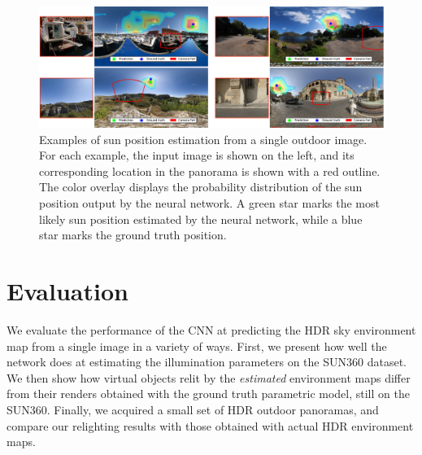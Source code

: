 \newcommand{\EvalHeight}{3.5cm}
\newcommand{\RndrHght}{3.2cm}
\newcommand{\RndrWdth}{4.1cm}
\newcommand{\CropWidth}{3.4cm}
\newcommand{\CropHght}{2.5cm}
\newcommand{\PanoWidth}{5.0cm}

\begin{figure}
    \centering
    \includegraphics[width=\linewidth]{figures/sunpos_estim/sunpos.pdf}
    \caption{Examples of sun position estimation from a single outdoor image. For each example, the input image is shown on the left, and its corresponding location in the panorama is shown with a red outline. The color overlay displays the probability distribution of the sun position output by the neural network. A green star marks the most likely sun position estimated by the neural network, while a blue star marks the ground truth position. }
    \label{fig:evaluation_example_sun_position}
\end{figure}

\section{Evaluation}
\label{sec:evaluation}

We evaluate the performance of the CNN at predicting the HDR sky environment map from a single image in a variety of ways. First, we present how well the network does at estimating the illumination parameters on the SUN360 dataset. We then show how virtual objects relit by the \emph{estimated} environment maps differ from their renders obtained with the ground truth parametric model, still on the SUN360. Finally, we acquired a small set of HDR outdoor panoramas, and compare our relighting results with those obtained with actual HDR environment maps. 

